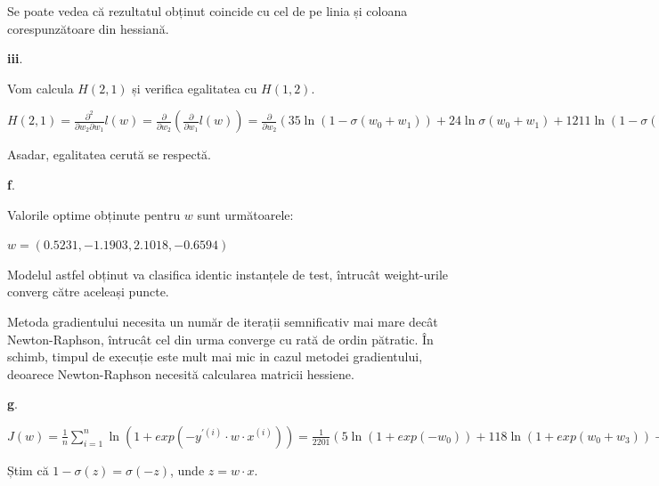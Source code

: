 \documentclass{article}
\begin{document}
Se poate vedea că rezultatul obținut coincide cu cel de pe linia și coloana corespunzătoare din hessiană.

\textbf{iii}.

Vom calcula \( H(2, 1) \) și verifica egalitatea cu \( H(1, 2) \).

\( H(2, 1) = \frac{\partial^2}{\partial w_2 \partial w_1} l(w) = \frac{\partial}{\partial w_2} (\frac{\partial}{\partial w_1} l(w)) 
= \frac{\partial}{\partial w_2} ( 35 \ln (1 - \sigma (w_0 + w_1)) + 24 \ln \sigma (w_0 + w_1) + 1211 \ln (1 - \sigma (w_0 + w_1 + w_3)) 
+ 281 \ln \sigma (w_0 + w_1 + w_3) + 17 \ln (1 - \sigma (w_0 + w_1 + w_2)) + 27 \ln \sigma (w_0 + w_1 + w_2) 
+ 105 \ln (1 - \sigma (w_0 + w_1 + w_2 + w_3)) + 176 \ln \sigma (w_0 + w_1 + w_2 + w_3) ) 
= \frac{\partial}{\partial w_2} (508 - 59 \sigma (w_0 + w_1) - 1492 \sigma (w_0 + w_1 + w_3) - 44 \sigma (w_0 + w_1 + w_2) - 281 \sigma (w_0 + w_1 + w_2 + w_3)) 
= -44 \sigma (w_0 + w_1 + w_2) (1 - \sigma (w_0 + w_1 + w_2)) - 281 \sigma (w_0 + w_1 + w_2 + w_3) (1 - \sigma (w_0 + w_1 + w_2 + w_3)) \)

Asadar, egalitatea cerută se respectă.

\noindent \textbf{f}.

Valorile optime obținute pentru \( w \) sunt următoarele:

\( w = (0.5231, -1.1903, 2.1018, -0.6594) \)

Modelul astfel obținut va clasifica identic instanțele de test, întrucât weight-urile converg către aceleași puncte.

Metoda gradientului necesita un număr de iterații semnificativ mai mare decât Newton-Raphson, întrucât cel din urma converge cu rată de ordin pătratic.
În schimb, timpul de execuție este mult mai mic in cazul metodei gradientului, deoarece Newton-Raphson necesită calcularea matricii hessiene.

\noindent \textbf{g}.

\( J(w) = \frac{1}{n} \sum_{i=1}^{n} \ln (1 + exp(-y^{'(i)} \cdot w \cdot x^{(i)})) 
= \frac{1}{2201} (5 \ln (1 + exp(-w_0)) + 118 \ln (1 + exp(w_0 + w_3)) + 57 \ln (1 + exp(-w_0 - w_3)) + \ln (1 + exp(-w_0 - w_2)) 
+ 4 \ln (1 + exp(w_0 + w_2 + w_3)) + 140 \ln (1+ exp(-w_0 - w_2 - w_3)) + 35 \ln (1 + exp (w_0 + w_1)) + 24 \ln (1 + exp(-w_0 - w_1)) 
+ 1211 \ln (1 + exp(w_0 + w_1 + w_3)) + 281 \ln (1 + exp(-w_0 - w_1 - w_2)) + 
105 \ln (1 + exp(w_0 + w_1 + w_2 + w_3)) + 176 \ln (1 + exp(-w_0 - w_1 - w_2 - w_3))) \)

Știm că \( 1 - \sigma (z) = \sigma (-z) \), unde \( z = w \cdot x \).
\end{document}
